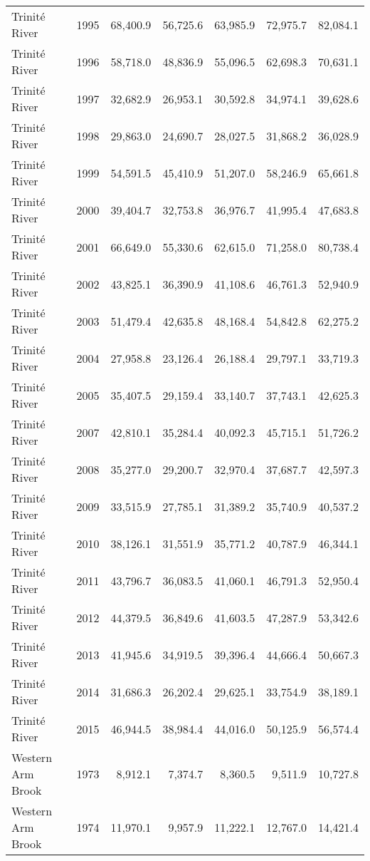 \begin{longtable}{llrrrrr}
  Trinité River & 1995 & 68,400.9 & 56,725.6 & 63,985.9 & 72,975.7 & 82,084.1 \\ 
  Trinité River & 1996 & 58,718.0 & 48,836.9 & 55,096.5 & 62,698.3 & 70,631.1 \\ 
  Trinité River & 1997 & 32,682.9 & 26,953.1 & 30,592.8 & 34,974.1 & 39,628.6 \\ 
  Trinité River & 1998 & 29,863.0 & 24,690.7 & 28,027.5 & 31,868.2 & 36,028.9 \\ 
  Trinité River & 1999 & 54,591.5 & 45,410.9 & 51,207.0 & 58,246.9 & 65,661.8 \\ 
  Trinité River & 2000 & 39,404.7 & 32,753.8 & 36,976.7 & 41,995.4 & 47,683.8 \\ 
  Trinité River & 2001 & 66,649.0 & 55,330.6 & 62,615.0 & 71,258.0 & 80,738.4 \\ 
  Trinité River & 2002 & 43,825.1 & 36,390.9 & 41,108.6 & 46,761.3 & 52,940.9 \\ 
  Trinité River & 2003 & 51,479.4 & 42,635.8 & 48,168.4 & 54,842.8 & 62,275.2 \\ 
  Trinité River & 2004 & 27,958.8 & 23,126.4 & 26,188.4 & 29,797.1 & 33,719.3 \\ 
  Trinité River & 2005 & 35,407.5 & 29,159.4 & 33,140.7 & 37,743.1 & 42,625.3 \\ 
  Trinité River & 2007 & 42,810.1 & 35,284.4 & 40,092.3 & 45,715.1 & 51,726.2 \\ 
  Trinité River & 2008 & 35,277.0 & 29,200.7 & 32,970.4 & 37,687.7 & 42,597.3 \\ 
  Trinité River & 2009 & 33,515.9 & 27,785.1 & 31,389.2 & 35,740.9 & 40,537.2 \\ 
  Trinité River & 2010 & 38,126.1 & 31,551.9 & 35,771.2 & 40,787.9 & 46,344.1 \\ 
  Trinité River & 2011 & 43,796.7 & 36,083.5 & 41,060.1 & 46,791.3 & 52,950.4 \\ 
  Trinité River & 2012 & 44,379.5 & 36,849.6 & 41,603.5 & 47,287.9 & 53,342.6 \\ 
  Trinité River & 2013 & 41,945.6 & 34,919.5 & 39,396.4 & 44,666.4 & 50,667.3 \\ 
  Trinité River & 2014 & 31,686.3 & 26,202.4 & 29,625.1 & 33,754.9 & 38,189.1 \\ 
  Trinité River & 2015 & 46,944.5 & 38,984.4 & 44,016.0 & 50,125.9 & 56,574.4 \\ 
  Western Arm Brook & 1973 & 8,912.1 & 7,374.7 & 8,360.5 & 9,511.9 & 10,727.8 \\ 
  Western Arm Brook & 1974 & 11,970.1 & 9,957.9 & 11,222.1 & 12,767.0 & 14,421.4 \\ 

\end{longtable}
